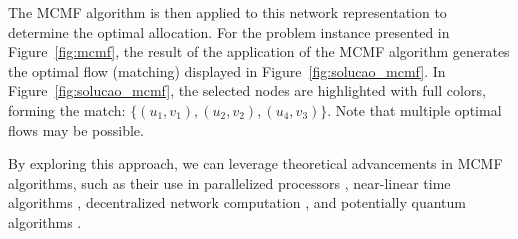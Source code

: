             The MCMF algorithm is then applied to this network representation to determine the optimal allocation. 
            For the problem instance presented in Figure~\ref{fig:mcmf}, the result of the application of the MCMF algorithm generates the optimal flow (matching) displayed in Figure~\ref{fig:solucao_mcmf}.
            In Figure~\ref{fig:solucao_mcmf}, the selected nodes are highlighted with full colors, forming the match: $\{(u_1, v_1), (u_2, v_2), (u_4, v_3)\}$.
            Note that multiple optimal flows may be possible.
            
            By exploring this approach, we can leverage theoretical advancements in MCMF algorithms, such as their use in parallelized processors \cite{akidau2013millwheel}, near-linear time algorithms \cite{9996881}, decentralized network computation \cite{alon2019decentralized}, and potentially quantum algorithms \cite{brandao2019quantum}.
             
        
        

                        
    
                        
